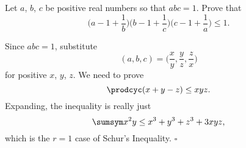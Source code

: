
\begin{problem}[ISL 2000 A1]
    Let $a$, $b$, $c$ be positive real numbers so that $abc = 1$. Prove that
    \[\bigg(a-1+\frac1b\bigg) \bigg(b-1+\frac1c\bigg) \bigg(c-1+\frac1a\bigg) \leq 1.\]
\end{problem}

\begin{solution}[Ritwin]
    Since $abc=1$, substitute
    \[(a, b, c) = \bigg(\frac xy, \frac yz, \frac zx\bigg)\]
    for positive $x$, $y$, $z$. We need to prove
    \[\prodcyc (x + y - z) \leq xyz.\]
    Expanding, the inequality is really just
    \[\sumsym x^2y \leq x^3 + y^3 + z^3 + 3xyz,\]
    which is the $r=1$ case of Schur's Inequality. $\square$
\end{solution}
